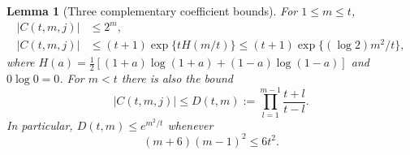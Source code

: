 \documentclass[11pt,a4paper]{article}
\newtheorem{lemma}[theorem]{Lemma}
\theoremstyle{definition}
\theoremstyle{remark}
\numberwithin{equation}{section}
\begin{document}
\begin{lemma}[Three complementary coefficient bounds]
\label{E:cba:threebounds}
For $1\le m\le t$,
\begin{align}
 |C(t,m,j)|&\le 2^m,\label{E:cba:degreebound}\\
 |C(t,m,j)|&\le (t+1)\exp\{tH(m/t)\}
       \le(t+1)\exp\{(\log2)m^2/t\},\label{E:cba:contourbound}
\end{align}
where $H(a)=\frac12[(1+a)\log(1+a)+(1-a)\log(1-a)]$ and $0\log0=0$.
For $m<t$ there is also the bound
\begin{equation}\label{E:cba:dettebound}
 |C(t,m,j)|\le D(t,m):=
          \prod_{l=1}^{m-1}\frac{t+l}{t-l}.
\end{equation}
In particular, $D(t,m)\le e^{m^2/t}$ whenever
\begin{equation}\label{E:cba:integercriterion}
 (m+6)(m-1)^2\le6t^2.
\end{equation}
\end{lemma}
\end{document}
